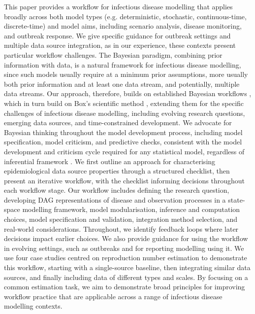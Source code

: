\documentclass{article}
\begin{document}
This paper provides a workflow for infectious disease modelling that applies broadly across both model types (e.g. deterministic, stochastic, continuous-time, discrete-time) and model aims, including scenario analysis, disease monitoring, and outbreak response. We give specific guidance for outbreak settings and multiple data source integration, as in our experience, these contexts present particular workflow challenges.
The Bayesian paradigm, combining prior information with data, is a natural framework for infectious disease modelling, since such models usually require at a minimum prior assumptions, more usually both prior information and at least one data stream, and potentially, multiple data streams. Our approach, therefore, builds on established Bayesian workflows \citep{green2003highly,gelman2020bayesian}, which in turn build on Box's scientific method \citep{box1979robustness,Box1980}, extending them for the specific challenges of infectious disease modelling, including evolving research questions, emerging data sources, and time-constrained development.
We advocate for Bayesian thinking throughout the model development process, including model specification, model criticism, and predictive checks, consistent with the model development and criticism cycle required for any statistical model, regardless of inferential framework \citep{box1979robustness}.
We first outline an approach for characterising epidemiological data source properties through a structured checklist, then present an iterative workflow, with the checklist informing decisions throughout each workflow stage.
Our workflow includes defining the research question, developing \ac{DAG} representations of disease and observation processes in a state-space modelling framework, model modularisation, inference and computation choices, model specification and validation, integration method selection, and real-world considerations.
Throughout, we identify feedback loops where later decisions impact earlier choices.
We also provide guidance for using the workflow in evolving settings, such as outbreaks and for reporting modelling using it.
We use four case studies centred on reproduction number estimation to demonstrate this workflow, starting with a single-source baseline, then integrating similar data sources, and finally including data of different types and scales.
By focusing on a common estimation task, we aim to demonstrate broad principles for improving workflow practice that are applicable across a range of infectious disease modelling contexts.
\end{document}
